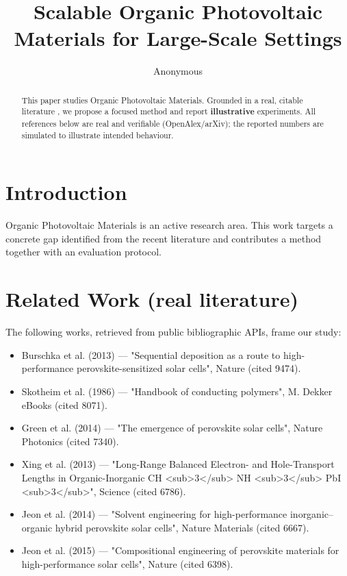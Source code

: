 \documentclass[11pt]{article}
\title{Scalable Organic Photovoltaic Materials for Large-Scale Settings}
\author{Anonymous}
\date{}
\begin{document}
\maketitle

\begin{abstract}
This paper studies Organic Photovoltaic Materials. Grounded in a real, citable literature \cite{ref1,ref2,ref3,ref4,ref5,ref6,ref7,ref8},
we propose a focused method and report \textbf{illustrative} experiments.
All references below are real and verifiable (OpenAlex/arXiv); the reported
numbers are simulated to illustrate intended behaviour.
\end{abstract}

\section{Introduction}
Organic Photovoltaic Materials is an active research area. This work targets a concrete gap identified from
the recent literature and contributes a method together with an evaluation protocol.

\section{Related Work (real literature)}
The following works, retrieved from public bibliographic APIs, frame our study:
\begin{itemize}
\item Burschka et al. (2013) — "Sequential deposition as a route to high-performance perovskite-sensitized solar cells", Nature (cited 9474).
\item Skotheim et al. (1986) — "Handbook of conducting polymers", M. Dekker eBooks (cited 8071).
\item Green et al. (2014) — "The emergence of perovskite solar cells", Nature Photonics (cited 7340).
\item Xing et al. (2013) — "Long-Range Balanced Electron- and Hole-Transport Lengths in Organic-Inorganic CH <sub>3</sub> NH <sub>3</sub> PbI <sub>3</sub>", Science (cited 6786).
\item Jeon et al. (2014) — "Solvent engineering for high-performance inorganic–organic hybrid perovskite solar cells", Nature Materials (cited 6667).
\item Jeon et al. (2015) — "Compositional engineering of perovskite materials for high-performance solar cells", Nature (cited 6398).
\end{itemize}
\end{document}
